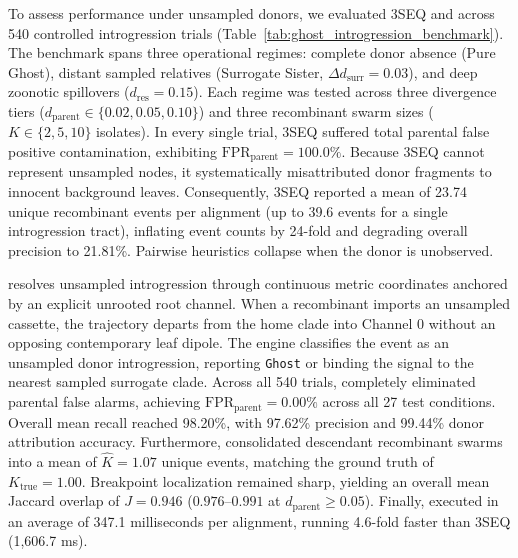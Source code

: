 To assess performance under unsampled donors, we evaluated 3SEQ and \RhizAeon across 540 controlled introgression trials (Table~\ref{tab:ghost_introgression_benchmark}).
The benchmark spans three operational regimes: complete donor absence (Pure Ghost), distant sampled relatives (Surrogate Sister, $\Delta d_{\text{surr}} = 0.03$), and deep zoonotic spillovers ($d_{\text{res}} = 0.15$).
Each regime was tested across three divergence tiers ($d_{\text{parent}} \in \{0.02, 0.05, 0.10\}$) and three recombinant swarm sizes ($K \in \{2, 5, 10\}$ isolates).
In every single trial, 3SEQ suffered total parental false positive contamination, exhibiting $\text{FPR}_{\text{parent}} = 100.0\%$.
Because 3SEQ cannot represent unsampled nodes, it systematically misattributed donor fragments to innocent background leaves.
Consequently, 3SEQ reported a mean of 23.74 unique recombinant events per alignment (up to 39.6 events for a single introgression tract), inflating event counts by 24-fold and degrading overall precision to 21.81\%.
Pairwise heuristics collapse when the donor is unobserved.

\RhizAeon resolves unsampled introgression through continuous metric coordinates anchored by an explicit unrooted root channel.
When a recombinant imports an unsampled cassette, the trajectory departs from the home clade into Channel 0 without an opposing contemporary leaf dipole.
The engine classifies the event as an unsampled donor introgression, reporting \texttt{Ghost} or binding the signal to the nearest sampled surrogate clade.
Across all 540 trials, \RhizAeon completely eliminated parental false alarms, achieving $\text{FPR}_{\text{parent}} = 0.00\%$ across all 27 test conditions.
Overall mean recall reached 98.20\%, with 97.62\% precision and 99.44\% donor attribution accuracy.
Furthermore, \RhizAeon consolidated descendant recombinant swarms into a mean of $\hat{K} = 1.07$ unique events, matching the ground truth of $K_{\text{true}} = 1.00$.
Breakpoint localization remained sharp, yielding an overall mean Jaccard overlap of $J = 0.946$ ($0.976\text{--}0.991$ at $d_{\text{parent}} \ge 0.05$).
Finally, \RhizAeon executed in an average of 347.1 milliseconds per alignment, running 4.6-fold faster than 3SEQ (1,606.7 ms).


